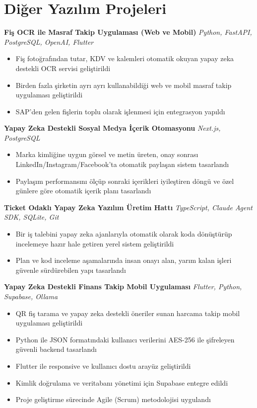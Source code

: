 \documentclass[10pt,a4paper]{extarticle}
\begin{document}
\section{Diğer Yazılım Projeleri}
\textbf{Fiş OCR ile Masraf Takip Uygulaması (Web ve Mobil)} \hfill \textit{Python, FastAPI, PostgreSQL, OpenAI, Flutter}
\begin{itemize}[leftmargin=*,noitemsep,topsep=0pt]
    \item Fiş fotoğrafından tutar, KDV ve kalemleri otomatik okuyan yapay zeka destekli OCR servisi geliştirildi
    \item Birden fazla şirketin ayrı ayrı kullanabildiği web ve mobil masraf takip uygulaması geliştirildi
    \item SAP'den gelen fişlerin toplu olarak işlenmesi için entegrasyon yapıldı
\end{itemize}
\textbf{Yapay Zeka Destekli Sosyal Medya İçerik Otomasyonu} \hfill \textit{Next.js, PostgreSQL}
\begin{itemize}[leftmargin=*,noitemsep,topsep=0pt]
    \item Marka kimliğine uygun görsel ve metin üreten, onay sonrası LinkedIn/Instagram/Facebook'ta otomatik paylaşan sistem tasarlandı
    \item Paylaşım performansını ölçüp sonraki içerikleri iyileştiren döngü ve özel günlere göre otomatik içerik planı tasarlandı
\end{itemize}
\textbf{Ticket Odaklı Yapay Zeka Yazılım Üretim Hattı} \hfill \textit{TypeScript, Claude Agent SDK, SQLite, Git}
\begin{itemize}[leftmargin=*,noitemsep,topsep=0pt]
    \item Bir iş talebini yapay zeka ajanlarıyla otomatik olarak koda dönüştürüp incelemeye hazır hale getiren yerel sistem geliştirildi
    \item Plan ve kod inceleme aşamalarında insan onayı alan, yarım kalan işleri güvenle sürdürebilen yapı tasarlandı
\end{itemize}
\textbf{Yapay Zeka Destekli Finans Takip Mobil Uygulaması} \hfill \textit{Flutter, Python, Supabase, Ollama}
\begin{itemize}[leftmargin=*,noitemsep,topsep=0pt]
    \item QR fiş tarama ve yapay zeka destekli öneriler sunan harcama takip mobil uygulaması geliştirildi
    \item Python ile JSON formatındaki kullanıcı verilerini AES-256 ile şifreleyen güvenli backend tasarlandı
    \item Flutter ile responsive ve kullanıcı dostu arayüz geliştirildi
    \item Kimlik doğrulama ve veritabanı yönetimi için Supabase entegre edildi
    \item Proje geliştirme sürecinde Agile (Scrum) metodolojisi uygulandı
\end{itemize}
\end{document}
